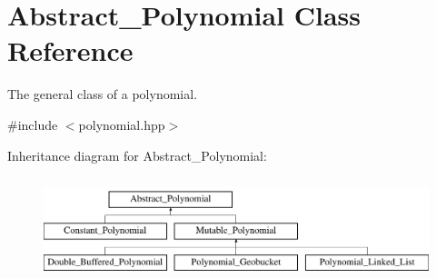 \hypertarget{class_abstract___polynomial}{}\section{Abstract\+\_\+\+Polynomial Class Reference}
\label{class_abstract___polynomial}


The general class of a polynomial.  




{\ttfamily \#include $<$polynomial.\+hpp$>$}

Inheritance diagram for Abstract\+\_\+\+Polynomial\+:\begin{figure}[H]
\begin{center}
\leavevmode
\includegraphics[height=3.000000cm]{class_abstract___polynomial}
\end{center}
\end{figure}
